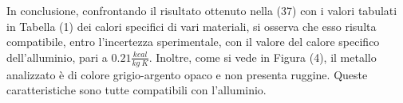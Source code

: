 In conclusione, confrontando il risultato ottenuto nella (37) con i valori tabulati in Tabella (1) dei calori specifici di vari materiali, si osserva che esso risulta compatibile, entro l'incertezza sperimentale, con il valore del calore specifico dell'alluminio, pari a $0.21 \frac{kcal}{kg\ K}$. Inoltre, come si vede in Figura (4), il metallo analizzato è di colore grigio-argento opaco e non presenta ruggine. Queste caratteristiche sono tutte compatibili con l'alluminio.